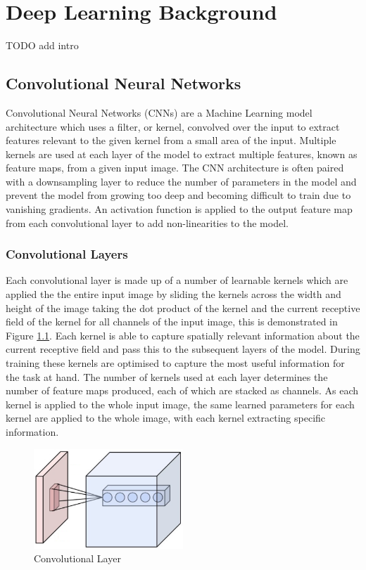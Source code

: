 %
%
%
%
%

\chapter{Deep Learning Background}
TODO add intro

\section{Convolutional Neural Networks}
Convolutional Neural Networks (CNNs) are a Machine Learning model architecture which uses a filter, or kernel, convolved over the input to extract features relevant to the given kernel from a small area of the input.
Multiple kernels are used at each layer of the model to extract multiple features, known as feature maps, from a given input image.
The CNN architecture is often paired with a downsampling layer to reduce the number of parameters in the model and prevent the model from growing too deep and becoming difficult to train due to vanishing gradients.
An activation function is applied to the output feature map from each convolutional layer to add non-linearities to the model. 

\subsection{Convolutional Layers}
Each convolutional layer is made up of a number of learnable kernels which are applied the the entire input image by sliding the kernels across the width and height of the image taking the dot product of the kernel and the current receptive field of the kernel for all channels of the input image, this is demonstrated in Figure \ref{fig:Conv_Layer}.
Each kernel is able to capture spatially relevant information about the current receptive field and pass this to the subsequent layers of the model.
During training these kernels are optimised to capture the most useful information for the task at hand.
The number of kernels used at each layer determines the number of feature maps produced, each of which are stacked as channels.
As each kernel is applied to the whole input image, the same learned parameters for each kernel are applied to the whole image, with each kernel extracting specific information.

\begin{figure}[h]
    \centering
        \includegraphics[width=0.5\textwidth]{figures/conv_layer.png}
    \caption{Convolutional Layer}\label{fig:Conv_Layer}
\end{figure}

